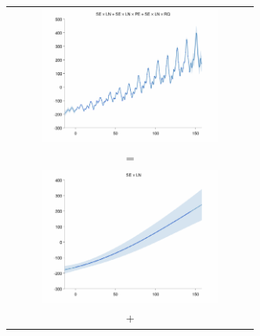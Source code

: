 \documentclass[twoside]{article}
\begin{document}
\begin{figure}[h!]
\centering
\newcommand{\wagd}{8cm}  %
\newcommand{\hagd}{4.5cm}  %
\begin{tabular}{c}
 \includegraphics[width=\wagd,height=\hagd]{../figures/decomposition/01-airline-months_max_level_8/01-airline-months_all} \\ 
 = \\ 
 \includegraphics[width=\wagd,height=\hagd]{../figures/decomposition/01-airline-months_max_level_8/01-airline-months_1} \\
 + \\

\end{tabular}
\end{figure}
\end{document}
